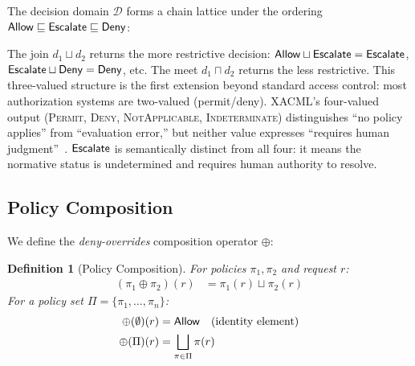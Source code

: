 \documentclass[11pt,a4paper]{article}
\newtheorem{definition}{Definition}[section]
\newcommand{\termlabel}[1]{\ifmmode\mathsf{#1}\else{\normalfont\textsc{\MakeLowercase{#1}}}\fi}
\newcommand{\Allow}{\termlabel{Allow}}
\newcommand{\Deny}{\termlabel{Deny}}
\newcommand{\Escalate}{\termlabel{Escalate}}
\begin{document}
The decision domain $\mathcal{D}$ forms a chain lattice under the ordering $\Allow \sqsubseteq \Escalate \sqsubseteq \Deny$:

\begin{center}
\end{center}

\noindent The join $d_1 \sqcup d_2$ returns the more restrictive decision: $\Allow \sqcup \Escalate = \Escalate$, $\Escalate \sqcup \Deny = \Deny$, etc. The meet $d_1 \sqcap d_2$ returns the less restrictive. This three-valued structure is the first extension beyond standard access control: most authorization systems are two-valued (permit/deny). XACML's four-valued output (\textsc{Permit}, \textsc{Deny}, \textsc{NotApplicable}, \textsc{Indeterminate}) distinguishes ``no policy applies'' from ``evaluation error,'' but neither value expresses ``requires human judgment''~\citep{xacml2013}. $\Escalate$ is semantically distinct from all four: it means the normative status is undetermined and requires human authority to resolve.

\subsection{Policy Composition}

We define the \emph{deny-overrides} composition operator $\oplus$:

\begin{definition}[Policy Composition]
\label{def:composition}
For policies $\pi_1, \pi_2$ and request $r$:
\begin{align}
(\pi_1 \oplus \pi_2)(r) &= \pi_1(r) \sqcup \pi_2(r)
\end{align}
For a policy set $\Pi = \{\pi_1, \ldots, \pi_n\}$:
\begin{align}
\oplus(\emptyset)(r) &= \Allow \quad\text{(identity element)} \\
\oplus(\Pi)(r) &= \bigsqcup_{\pi \in \Pi} \pi(r)
\end{align}
\end{definition}
\end{document}
